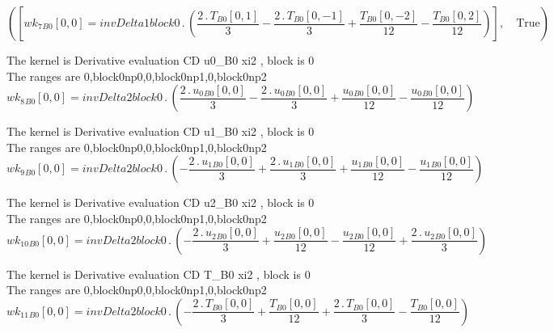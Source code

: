 \documentclass{article}
\begin{document}
\begin{dmath}\left ( \left [ {wk_{7}{_{B0}}}[{0,0}] = invDelta1block0 \,.\, \left(\frac{2 \,.\, {T{_{B0}}}[{0,1}]}{3} - \frac{2 \,.\, {T{_{B0}}}[{0,-1}]}{3} + \frac{{T{_{B0}}}[{0,-2}]}{12} - \frac{{T{_{B0}}}[{0,2}]}{12}\right)\right ], \quad 
\mathrm{True}\right )\end{dmath}

\noindent The kernel is Derivative evaluation CD u0_B0 xi2 , block is 0\\\noindent The ranges are 0,block0np0,0,block0np1,0,block0np2\\\begin{dmath}{wk_{8}{_{B0}}}[{0,0}] = invDelta2block0 \,.\, \left(\frac{2 \,.\, {u_{0}{_{B0}}}[{0,0}]}{3} - \frac{2 \,.\, {u_{0}{_{B0}}}[{0,0}]}{3} + \frac{{u_{0}{_{B0}}}[{0,0}]}{12} - \frac{{u_{0}{_{B0}}}[{0,0}]}{12}\right)\end{dmath}

\noindent The kernel is Derivative evaluation CD u1_B0 xi2 , block is 0\\\noindent The ranges are 0,block0np0,0,block0np1,0,block0np2\\\begin{dmath}{wk_{9}{_{B0}}}[{0,0}] = invDelta2block0 \,.\, \left(- \frac{2 \,.\, {u_{1}{_{B0}}}[{0,0}]}{3} + \frac{2 \,.\, {u_{1}{_{B0}}}[{0,0}]}{3} + \frac{{u_{1}{_{B0}}}[{0,0}]}{12} - \frac{{u_{1}{_{B0}}}[{0,0}]}{12}\right)\end{dmath}

\noindent The kernel is Derivative evaluation CD u2_B0 xi2 , block is 0\\\noindent The ranges are 0,block0np0,0,block0np1,0,block0np2\\\begin{dmath}{wk_{10}{_{B0}}}[{0,0}] = invDelta2block0 \,.\, \left(- \frac{2 \,.\, {u_{2}{_{B0}}}[{0,0}]}{3} + \frac{{u_{2}{_{B0}}}[{0,0}]}{12} - \frac{{u_{2}{_{B0}}}[{0,0}]}{12} + \frac{2 \,.\, {u_{2}{_{B0}}}[{0,0}]}{3}\right)\end{dmath}

\noindent The kernel is Derivative evaluation CD T_B0 xi2 , block is 0\\\noindent The ranges are 0,block0np0,0,block0np1,0,block0np2\\\begin{dmath}{wk_{11}{_{B0}}}[{0,0}] = invDelta2block0 \,.\, \left(- \frac{2 \,.\, {T{_{B0}}}[{0,0}]}{3} + \frac{{T{_{B0}}}[{0,0}]}{12} + \frac{2 \,.\, {T{_{B0}}}[{0,0}]}{3} - \frac{{T{_{B0}}}[{0,0}]}{12}\right)\end{dmath}
\end{document}
